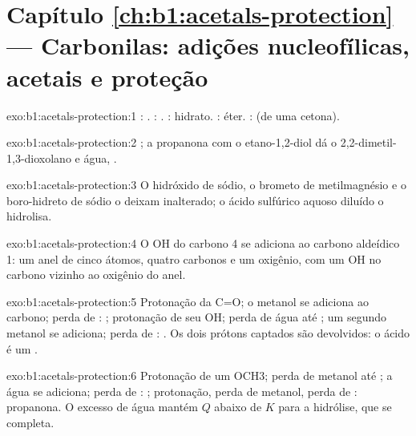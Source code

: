 \section*{Capítulo \ref{ch:b1:acetals-protection} --- Carbonilas: adições nucleofílicas, acetais e proteção}

\begin{solution}{exo:b1:acetals-protection:1}
: . : .
: hidrato. : éter. :
 (de uma cetona).
\end{solution}

\begin{solution}{exo:b1:acetals-protection:2}
; a propanona com o
etano-1,2-diol dá o 2,2-dimetil-1,3-dioxolano e água,
.
\end{solution}

\begin{solution}{exo:b1:acetals-protection:3}
O hidróxido de sódio, o brometo de metilmagnésio e o boro-hidreto de
sódio o deixam inalterado; o ácido sulfúrico aquoso diluído o hidrolisa.
\end{solution}

\begin{solution}{exo:b1:acetals-protection:4}
O OH do carbono 4 se adiciona ao carbono aldeídico 1: um anel de cinco
átomos, quatro carbonos e um oxigênio, com um OH no carbono vizinho ao
oxigênio do anel.
\end{solution}

\begin{solution}{exo:b1:acetals-protection:5}
Protonação da C=O; o metanol se adiciona ao carbono; perda de :
; protonação de seu OH; perda de água até ; um
segundo metanol se adiciona; perda de : . Os dois
prótons captados são devolvidos: o ácido é um .
\end{solution}

\begin{solution}{exo:b1:acetals-protection:6}
Protonação de um OCH3; perda de metanol até ; a água se
adiciona; perda de : ; protonação, perda de metanol, perda
de : propanona. O excesso de água mantém $Q$ abaixo de $K$ para a
hidrólise, que se completa.
\end{solution}

